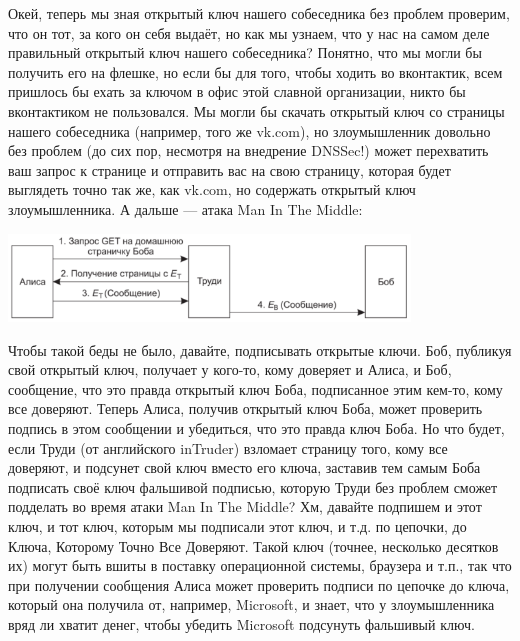 \documentclass{../mcstext}
\begin{document}
Окей, теперь мы зная открытый ключ нашего собеседника без проблем проверим, что он тот, за кого он себя выдаёт, но как мы узнаем, что у нас на самом деле правильный открытый ключ нашего собеседника? Понятно, что мы могли бы получить его на флешке, но если бы для того, чтобы ходить во вконтактик, всем пришлось бы ехать за ключом в офис этой славной организации, никто бы вконтактиком не пользовался. Мы могли бы скачать открытый ключ со страницы нашего собеседника (например, того же vk.com), но злоумышленник довольно без проблем (до сих пор, несмотря на внедрение DNSSec!) может перехватить ваш запрос к странице и отправить вас на свою страницу, которая будет выглядеть точно так же, как vk.com, но содержать открытый ключ злоумышленника. А дальше --- атака Man In The Middle:

\begin{center}
    \includegraphics[width=0.8\textwidth]{manInTheMiddle.png}
\end{center}

Чтобы такой беды не было, давайте, подписывать открытые ключи. Боб, публикуя свой открытый ключ, получает у кого-то, кому доверяет и Алиса, и Боб, сообщение, что это правда открытый ключ Боба, подписанное этим кем-то, кому все доверяют. Теперь Алиса, получив открытый ключ Боба, может проверить подпись в этом сообщении и убедиться, что это правда ключ Боба. Но что будет, если Труди (от английского inTruder) взломает страницу того, кому все доверяют, и подсунет свой ключ вместо его ключа, заставив тем самым Боба подписать своё ключ фальшивой подписью, которую Труди без проблем сможет подделать во время атаки Man In The Middle? Хм, давайте подпишем и этот ключ, и тот ключ, которым мы подписали этот ключ, и т.д. по цепочки, до Ключа, Которому Точно Все Доверяют. Такой ключ (точнее, несколько десятков их) могут быть вшиты в поставку операционной системы, браузера и т.п., так что при получении сообщения Алиса может проверить подписи по цепочке до ключа, который она получила от, например, Microsoft, и знает, что у злоумышленника вряд ли хватит денег, чтобы убедить Microsoft подсунуть фальшивый ключ.
\end{document}
